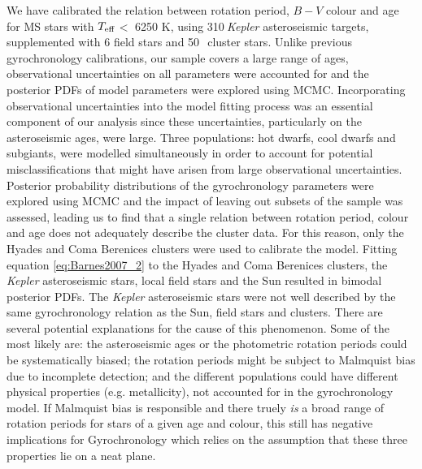 \documentclass[useAMS, usenatbib]{mn2e}
\newcommand{\teff}{$T_{\rm{eff}}$}
\newcommand{\nastero}{310}
\newcommand{\nHC}{50~}
\begin{document}
We have calibrated the relation between rotation period, $B-V$ colour and age
for MS stars with \teff$<$ 6250 K, using \nastero$~${\it Kepler} asteroseismic
targets, supplemented with 6 field stars and \nHC$~$cluster stars.
Unlike previous gyrochronology calibrations, our sample covers a large range
of ages, observational uncertainties on all parameters were accounted for and
the posterior PDFs of model parameters were explored using MCMC.
Incorporating observational uncertainties into the model fitting process was
an essential component of our analysis since these uncertainties, particularly
on the asteroseismic ages, were large.
Three populations: hot dwarfs, cool dwarfs and subgiants, were modelled
simultaneously in order to account for potential misclassifications that
might have arisen from large observational uncertainties.
Posterior probability distributions of the gyrochronology parameters were
explored using MCMC and the impact of leaving out subsets of the sample was
assessed, leading us to find that a single relation between rotation period,
colour and age does not adequately describe the cluster data.
For this reason, only the Hyades and Coma Berenices clusters were used to
calibrate the model.
Fitting equation \ref{eq:Barnes2007_2} to the Hyades and Coma Berenices
clusters, the {\it Kepler} asteroseismic stars, local field stars and the Sun
resulted in bimodal posterior PDFs.
The {\it Kepler} asteroseismic stars were not well described by the same
gyrochronology relation as the Sun, field stars and clusters.
There are several potential explanations for the cause of this phenomenon.
Some of the most likely are: the asteroseismic ages or the photometric
rotation periods could be systematically biased; the rotation periods might be
subject to Malmquist bias due to incomplete detection; and the different
populations could have different physical properties (e.g. metallicity), not
accounted for in the gyrochronology model.
If Malmquist bias is responsible and there truely {\it is} a broad range of
rotation periods for stars of a given age and colour, this still has
negative implications for Gyrochronology which relies on the assumption that
these three properties lie on a neat plane.

\end{document}
